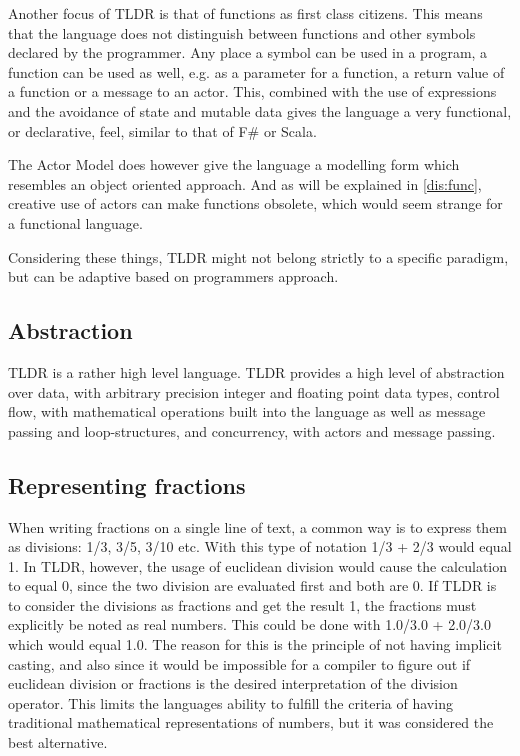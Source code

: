 Another focus of TLDR is that of functions as first class citizens. This means that the language does not distinguish between functions and other symbols declared by the programmer. Any place a symbol can be used in a program, a function can be used as well, e.g. as a parameter for a function, a return value of a function or a message to an actor. This, combined with the use of expressions and the avoidance of state and mutable data gives the language a very functional, or declarative, feel, similar to that of F\# or Scala.

The Actor Model does however give the language a modelling form which resembles an object oriented approach. And as will be explained in \cref{dis:func}, creative use of actors can make functions obsolete, which would seem strange for a functional language.

Considering these things, TLDR might not belong strictly to a specific paradigm, but can be adaptive based on programmers approach.

\subsection{Abstraction}
TLDR is a rather high level language. TLDR provides a high level of abstraction over data, with arbitrary precision integer and floating point data types, control flow, with mathematical operations built into the language as well as message passing and loop-structures, and concurrency, with actors and message passing.

\subsection{Representing fractions}\label{dis:frac}

When writing fractions on a single line of text, a common way is to express them as divisions: 1/3, 3/5, 3/10 etc. With this type of notation 1/3 + 2/3 would equal 1. In TLDR, however, the usage of euclidean division would cause the calculation to equal 0, since the two division are evaluated first and both are 0. If TLDR is to consider the divisions as fractions and get the result 1, the fractions must explicitly be noted as real numbers. This could be done with 1.0/3.0 + 2.0/3.0 which would equal 1.0. The reason for this is the principle of not having implicit casting, and also since it would be impossible for a compiler to figure out if euclidean division or fractions is the desired interpretation of the division operator. This limits the languages ability to fulfill the criteria of having traditional mathematical representations of numbers, but it was considered the best alternative.

